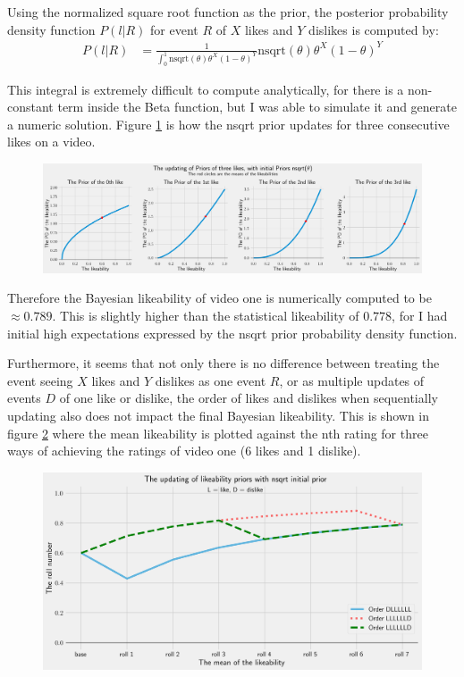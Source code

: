 \documentclass[a4paper,11pt]{article}
\begin{document}
Using the normalized square root function as the prior, the posterior probability density function $P(l|R)$ for event $R$ of $X$ likes and $Y$ dislikes is computed by:
\begin{align*}
    P(l|R) &= \frac{1}{\int_0^1 \text{nsqrt}(\theta) \theta^X (1-\theta)^Y } \text{nsqrt}(\theta) \theta^X (1-\theta)^Y
\end{align*}

This integral is extremely difficult to compute analytically, for there is a non-constant term inside the Beta function, but I was able to simulate it and generate a numeric solution. Figure \ref{fig:up_nsqrt} is how the nsqrt prior updates for three consecutive likes on a video.

\begin{figure}[H]
    \centering
    \includegraphics[width=\textwidth]{assets/nsqrt_updating_priors.png}
    \caption{}
    \label{fig:up_nsqrt}
\end{figure}

Therefore the Bayesian likeability of video one is numerically computed to be $\approx 0.789$. This is slightly higher than the statistical likeability of $0.778$, for I had initial high expectations expressed by the nsqrt prior probability density function.

Furthermore, it seems that not only there is no difference between treating the event seeing $X$ likes and $Y$ dislikes as one event $R$, or as multiple updates of events $D$ of one like or dislike, the order of likes and dislikes when sequentially updating also does not impact the final Bayesian likeability. This is shown in figure \ref{fig:nsqrt_incre} where the mean likeability is plotted against the nth rating for three ways of achieving the ratings of video one (6 likes and 1 dislike).

\begin{figure}[H]
    \centering
    \includegraphics[width=\textwidth]{assets/nsqrt_incre.png}
    \caption{}
    \label{fig:nsqrt_incre}
\end{figure}
\end{document}
